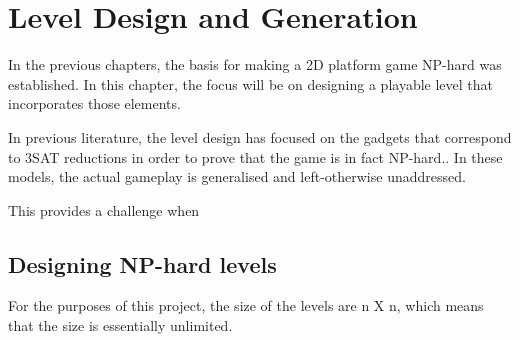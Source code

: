\documentclass[11pt, a4paper, oneside]{report} %
\begin{document}




\chapter{Level Design and Generation}

In the previous chapters, the basis for making a 2D platform game NP-hard was 
established. In this chapter, the focus will be on designing a playable level 
that incorporates those elements. 

In previous literature, the level design has focused on the gadgets that
correspond to 3SAT reductions in order to prove that the game is in
fact NP-hard.. In these models, the actual gameplay is
generalised and left-otherwise unaddressed. 

This provides a challenge when 

\section{Designing NP-hard levels}

For the purposes of this project, the size of the levels are n X n, which 
means that the size is essentially unlimited. 





\end{document}
